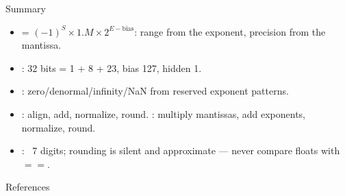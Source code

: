 \documentclass[aspectratio=169]{beamer}
\begin{document}
\begin{frame}{Summary}
  \begin{itemize}
    \item {} = $(-1)^S \times 1.M \times 2^{E-\text{bias}}$:
      range from the exponent, precision from the mantissa.
    \item {}: 32 bits = 1 + 8 + 23, bias 127, hidden 1.
    \item {}: zero/denormal/infinity/NaN from reserved
      exponent patterns.
    \item {}: align, add, normalize, round. : multiply
      mantissas, add exponents, normalize, round.
    \item {}: ~7 digits; rounding is silent and approximate ---
      never compare floats with $==$.
  \end{itemize}
\end{frame}

\begin{frame}{References}
  \footnotesize
  
  
\end{frame}
\end{document}
